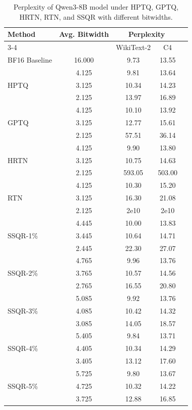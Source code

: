 \documentclass{article} %
\begin{document}
\begin{table}[htpb]
\caption{Perplexity of Qwen3-8B model under HPTQ, GPTQ, HRTN, RTN, and SSQR with different bitwidths.}
\label{tab:qwen8_results}
\begin{center}
\begin{tabular}{lcccc}
\toprule
Method & Avg. Bitwidth & \multicolumn{2}{c}{Perplexity}  \\
\cmidrule(r){3-4}
      &           & WikiText-2 & C4 \\
\midrule
BF16 Baseline & 16.000 & 9.73 & 13.55 \\
\midrule
\multirow{3}{*}{HPTQ} & 4.125 & 9.81 & 13.64 \\
           & 3.125 & 10.34 & 14.23 \\
           & 2.125 & 13.97 & 16.89  \\
\midrule
\multirow{3}{*}{GPTQ} & 4.125 & 10.10 & 13.92 \\
           & 3.125 & 12.77 & 15.61 \\
           & 2.125 & 57.51 & 36.14 \\
\midrule
\multirow{3}{*}{HRTN}   & 4.125 & 9.90 & 13.80 \\
           & 3.125 & 10.75 & 14.63 \\
           & 2.125 & 593.05 & 503.00 \\
\midrule
\multirow{3}{*}{RTN}   & 4.125 & 10.30 & 15.20 \\
           & 3.125 & 16.30 & 21.08 \\
           & 2.125 & 2e10 & 2e10 \\
\midrule
\multirow{3}{*}{SSQR-1\%} & 4.445 & 10.00 & 13.83 \\
           & 3.445 & 10.64 & 14.71 \\
           & 2.445 & 22.30 & 27.07 \\
\midrule
\multirow{3}{*}{SSQR-2\%} & 4.765 & 9.96 & 13.76 \\
           & 3.765 & 10.57 & 14.56 \\
           & 2.765 & 16.55 & 20.80 \\
\midrule
\multirow{3}{*}{SSQR-3\%} & 5.085 & 9.92 & 13.76 \\
           & 4.085 & 10.42 & 14.32 \\
           & 3.085 & 14.05 & 18.57 \\
\midrule
\multirow{3}{*}{SSQR-4\%} & 5.405 & 9.84 & 13.71 \\
           & 4.405 & 10.34 & 14.29 \\
           & 3.405 & 13.12 & 17.60 \\
\midrule
\multirow{3}{*}{SSQR-5\%} & 5.725 & 9.80 & 13.67 \\
           & 4.725 & 10.32 & 14.22 \\
           & 3.725 & 12.88 & 16.85 \\
\bottomrule
\end{tabular}
\end{center}
\end{table}
\end{document}
